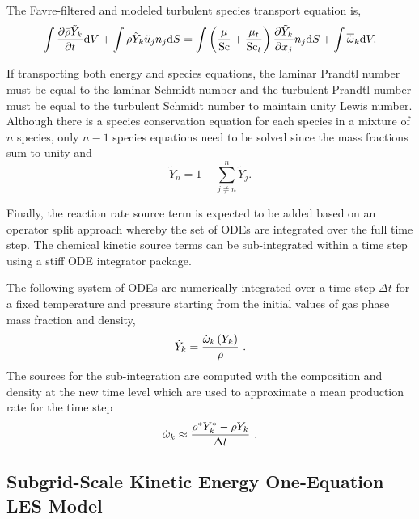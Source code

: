 The Favre-filtered and modeled turbulent species transport equation
is,
%
\begin{equation}
  \int {{\partial \bar{\rho} \tilde{Y}_k} \over {\partial t}} {\rm d}V
  + \int \bar{\rho} \tilde{Y}_k \tilde{u}_j n_j {\rm d}S = 
   \int \left( {\mu \over {\rm Sc}} 
              + {{\mu_t} \over {{\rm Sc}_t}}  \right)
          {{\partial \tilde{Y}_k} \over
           {\partial x_j}} n_j {\rm d}S + 
   \int \overline{\dot{\omega}}_k {\rm d}V .
\label{mod-species}
\end{equation}

If transporting both energy and species equations, the laminar Prandtl 
number must be equal to the laminar Schmidt number and the turbulent 
Prandtl number must be equal to the turbulent Schmidt number to maintain
unity Lewis number.  Although there is a species conservation equation 
for each species in a mixture of  $n$ species, only $n-1$ species equations
need to be solved since the mass fractions sum to unity and
%
\begin{equation}
  \tilde{Y}_n = 1 - \sum_{j \ne n}^{n} \tilde{Y}_j .
\end{equation}

Finally, the reaction rate source term is expected to be added based on an
operator split approach whereby the set of ODEs are integrated over the full
time step. The chemical kinetic source terms can be sub-integrated within
a time step using a stiff ODE integrator package. 

The following system of ODEs are numerically integrated over a time 
step $\Delta t$ for a fixed temperature and pressure starting from 
the initial values of gas phase mass fraction and density,
\begin{equation}
  \dot{Y}_k = {{\dot{\omega}_k \left( Y_k \right) } \over \rho} \ .
\end{equation}
The sources for the sub-integration are computed with the composition and density at the 
new time level which are used to approximate a mean production rate for the time step
\begin{equation}
  \dot{\omega}_k \approx {{\rho^{\ast} Y^{\ast}_k - \rho Y_k}
                           \over {\Delta t}} \ .
\end{equation}

\subsection{Subgrid-Scale Kinetic Energy One-Equation LES Model}

